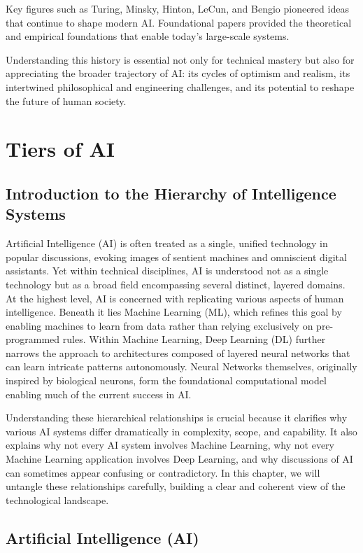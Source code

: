 \documentclass[openany]{book}
\begin{document}
Key figures such as Turing, Minsky, Hinton, LeCun, and Bengio pioneered ideas 
that continue to shape modern AI. Foundational papers provided the theoretical 
and empirical foundations that enable today's large-scale systems.

Understanding this history is essential not only for technical mastery but also 
for appreciating the broader trajectory of AI: its cycles of optimism and 
realism, its intertwined philosophical and engineering challenges, and its 
potential to reshape the future of human society.

\chapter{Tiers of AI}

\section{Introduction to the Hierarchy of Intelligence Systems}

Artificial Intelligence (AI) is often treated as a single, unified technology in
popular discussions, evoking images of sentient machines and omniscient digital 
assistants. Yet within technical disciplines, AI is understood not as a single 
technology but as a broad field encompassing several distinct, layered domains. 
At the highest level, AI is concerned with replicating various aspects of human 
intelligence. Beneath it lies Machine Learning (ML), which refines this goal by 
enabling machines to learn from data rather than relying exclusively on 
pre-programmed rules. Within Machine Learning, Deep Learning (DL) further 
narrows the approach to architectures composed of layered neural networks that 
can learn intricate patterns autonomously. Neural Networks themselves, 
originally inspired by biological neurons, form the foundational computational 
model enabling much of the current success in AI.

Understanding these hierarchical relationships is crucial because it clarifies 
why various AI systems differ dramatically in complexity, scope, and capability.
It also explains why not every AI system involves Machine Learning, why not 
every Machine Learning application involves Deep Learning, and why discussions 
of AI can sometimes appear confusing or contradictory. In this chapter, we will 
untangle these relationships carefully, building a clear and coherent view of 
the technological landscape.

\section{Artificial Intelligence (AI)}
\end{document}
